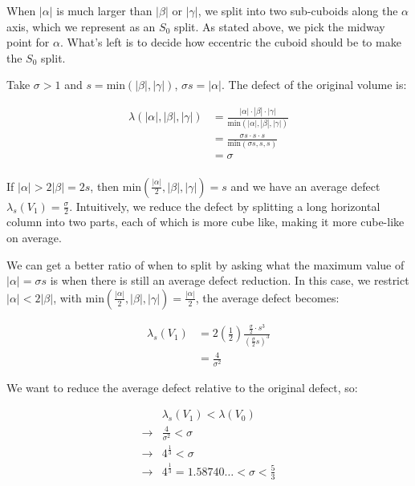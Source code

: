 When $|\alpha|$ is much larger than $|\beta|$ or $|\gamma|$,
we split into two sub-cuboids along the $\alpha$ axis,
which we represent as an $S_0$ split.
As stated above, we pick the midway point for $\alpha$.
What's left is to decide how eccentric the cuboid should be to make the $S_0$ split.

Take $\sigma > 1$ and $s = \text{min}(|\beta|,|\gamma|)$, $\sigma s = |\alpha|$.
The defect of the original volume is:

$$
\begin{array}{ll}
  \lambda(|\alpha|,|\beta|,|\gamma|)  & = \frac{ |\alpha| \cdot |\beta| \cdot |\gamma| }{ \text{min}(|\alpha|,|\beta|,|\gamma|) } \\
                  & = \frac{ \sigma s \cdot s \cdot s }{ \text{min}(\sigma s,s,s) } \\
                  & = \sigma \\
\end{array}
$$

If $|\alpha| > 2 |\beta| = 2s$, then $\text{min}(\frac{|\alpha|}{2},|\beta|,|\gamma|) = s$ and we have an average defect $\lambda_s(V_1) = \frac{\sigma}{2}$.
Intuitively, we reduce the defect by splitting a long horizontal column into two parts, each of which is more cube like,
making it more cube-like on average.

We can get a better ratio of when to split by asking what the maximum value of $|\alpha| = \sigma s$ is when there is still an average defect reduction.
In this case, we restrict $|\alpha| < 2 |\beta|$, with $\text{min}(\frac{|\alpha|}{2},|\beta|,|\gamma|) = \frac{|\alpha|}{2}$,
the average defect becomes:

$$
\begin{array}{ll}
  \lambda_s(V_1) & = 2 (\frac{1}{2}) \frac{ \frac{\sigma}{2} \cdot s^3 }{ (\frac{\sigma}{2} s)^3 } \\
   & = \frac{4}{\sigma^2}
\end{array}
$$

We want to reduce the average defect relative to the original defect, so:

$$
\begin{array}{ll}
  & \lambda_s (V_1) < \lambda(V_0) \\
  \to & \frac{4}{\sigma^2} < \sigma \\
  \to & 4^{\frac{1}{3}} < \sigma \\ 
  \to & 4^{\frac{1}{3}} = 1.58740\dots < \sigma < \frac{5}{3} \\
\end{array}
$$

